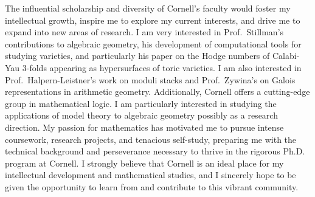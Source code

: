 \documentclass[11pt]{article}
\begin{document}
\par
The influential scholarship and diversity of Cornell’s faculty would foster my intellectual growth, inspire me to explore my current interests, and drive me to expand into new areas of research. I am very interested in Prof.\ Stillman’s contributions to algebraic geometry, his development of computational tools for studying varieties, and particularly his paper on the Hodge numbers of Calabi-Yau 3-folds appearing as hypersurfaces of toric varieties. I am also interested in Prof.\ Halpern-Leistner’s work on moduli stacks and Prof.\ Zywina’s on Galois representations in arithmetic geometry. Additionally, Cornell offers a cutting-edge group in mathematical logic. I am particularly interested in studying the applications of model theory to algebraic geometry possibly as a research direction. My passion for mathematics has motivated me to pursue intense coursework, research projects, and tenacious self-study, preparing me with the technical background and perseverance necessary to thrive in the rigorous Ph.D. program at Cornell. I strongly believe that Cornell is an ideal place for my intellectual development and mathematical studies, and I sincerely hope to be given the opportunity to learn from and contribute to this vibrant community.
\end{document}
